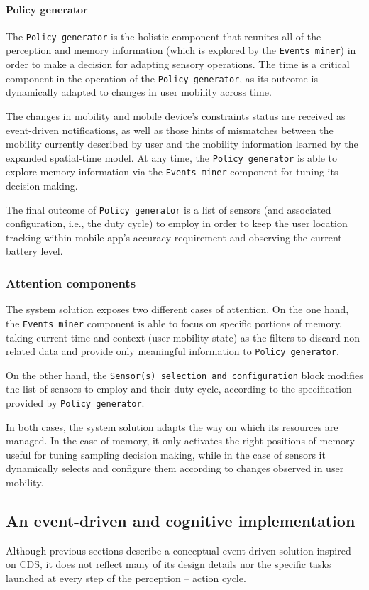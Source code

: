 \documentclass[ENG,PhD]{cinvestav}
\begin{document}
\paragraph*{Policy generator}
The \texttt{Policy generator} is the holistic component that reunites all of the perception and memory information (which is explored by the \texttt{Events miner}) in order to make a decision for adapting sensory operations.
The time is a critical component in the operation of the \texttt{Policy generator}, as its outcome is dynamically adapted to changes in user mobility across time.

The changes in mobility and mobile device's constraints status are received as event-driven notifications, as well as those hints of mismatches between the mobility currently described by user and the mobility information learned by the expanded spatial-time model.
At any time, the \texttt{Policy generator} is able to explore memory information via the \texttt{Events miner} component for tuning its decision making.

The final outcome of \texttt{Policy generator} is a list of sensors (and associated configuration, i.e., the duty cycle) to employ in order to keep the user location tracking within mobile app's accuracy requirement and observing the current battery level.


\subsubsection{Attention components}
The system solution exposes two different cases of attention.
On the one hand, the \texttt{Events miner} component is able to focus on specific portions of memory, taking current time and context (user mobility state) as the filters to discard non-related data and provide only meaningful information to \texttt{Policy generator}.

On the other hand, the \texttt{Sensor(s) selection and configuration} block modifies the list of sensors to employ and their duty cycle, according to the specification provided by \texttt{Policy generator}.

In both cases, the system solution adapts the way on which its resources are managed.
In the case of memory, it only activates the right positions of memory useful for tuning sampling decision making, while in the case of sensors it dynamically selects and configure them according to changes observed in user mobility.




\subsection{An event-driven and cognitive implementation}
Although previous sections describe a conceptual event-driven solution inspired on CDS, it does not reflect many of its design details nor the specific tasks launched at every step of the perception -- action cycle.
\end{document}
